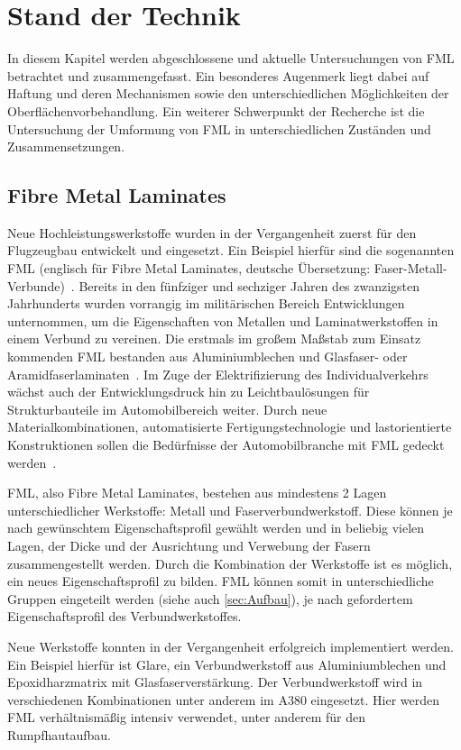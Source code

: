 \chapter{Stand der Technik}\label{cha:Stand}

In diesem Kapitel werden abgeschlossene und aktuelle Untersuchungen von FML betrachtet und zusammengefasst.
Ein besonderes Augenmerk liegt dabei auf Haftung und deren Mechanismen sowie den unterschiedlichen Möglichkeiten der Oberflächenvorbehandlung.
Ein weiterer Schwerpunkt der Recherche ist die Untersuchung der Umformung von FML in unterschiedlichen Zuständen und Zusammensetzungen.


\section{Fibre Metal Laminates}\label{sec:FML}

Neue Hochleistungswerkstoffe wurden in der Vergangenheit zuerst für den Flugzeugbau entwickelt und eingesetzt.
Ein Beispiel hierfür sind die sogenannten FML (englisch für Fibre Metal Laminates, deutsche Übersetzung: Faser-Metall-Verbunde)~.
Bereits in den fünfziger und sechziger Jahren des zwanzigsten Jahrhunderts wurden vorrangig im militärischen Bereich Entwicklungen unternommen, um die Eigenschaften von Metallen und Laminatwerkstoffen in einem Verbund zu vereinen.
Die erstmals im großem Maßstab zum Einsatz kommenden FML bestanden aus Aluminiumblechen und Glasfaser- oder Aramidfaserlaminaten~\cite{Vogelesang.2000}.
Im Zuge der Elektrifizierung des Individualverkehrs wächst auch der Entwicklungsdruck hin zu Leichtbaulösungen für Strukturbauteile im Automobilbereich weiter.
Durch neue Materialkombinationen, automatisierte Fertigungstechnologie und lastorientierte Konstruktionen sollen die Bedürfnisse der Automobilbranche mit FML gedeckt werden~\cite{Wollmann.2018}.

FML, also Fibre Metal Laminates, bestehen aus mindestens 2 Lagen unterschiedlicher Werkstoffe: Metall und Faserverbundwerkstoff.
Diese können je nach gewünschtem Eigenschaftsprofil gewählt werden und in beliebig vielen Lagen, der Dicke und der Ausrichtung und Verwebung der Fasern zusammengestellt werden.
Durch die Kombination der Werkstoffe ist es möglich, ein neues Eigenschaftsprofil zu bilden.
FML können somit in unterschiedliche Gruppen eingeteilt werden (siehe auch \autoref{sec:Aufbau}), je nach gefordertem Eigenschaftsprofil des Verbundwerkstoffes.

Neue Werkstoffe konnten in der Vergangenheit erfolgreich implementiert werden.
Ein Beispiel hierfür ist Glare, ein Verbundwerkstoff aus Aluminiumblechen und Epoxidharzmatrix mit Glasfaserverstärkung.
Der Verbundwerkstoff wird in verschiedenen Kombinationen unter anderem im A380 eingesetzt.
Hier werden FML verhältnismäßig intensiv verwendet, unter anderem für den Rumpfhautaufbau.~\cite{Airbus.05.04.2021, Vlot.2001}

